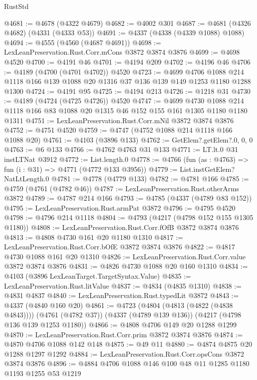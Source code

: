 \begin{lexlean}{RustStd}
\begin{coremodule}
@4681 := @4678 (@4322 @4679)
@4682 := @4002 @301
@4687 := @4681 (@4326 @4682) (@4331 (@4333 @53))
@4691 := @4337 (@4338 (@4339 @1088) @1088)
@4694 := @4555 (@4560 (@4687 @4691))
@4698 := LexLeanPreservation.Rust.Corr.mCons @3872 @3874 @3876
@4699 := @4698 @4520
@4700 := @4191 @46
@4701 := @4194 @209
@4702 := @4196 @46
@4706 := @4189 (@4700 (@4701 @4702)) @4520
@4723 := @4699
    @4706
    @1088
    @214
    @1118
    @166
    @139
    @1088
    @20
    @1316
    @37
    @136
    @139
    @149
    @1253
    @1180
    @1288
    @1300
@4724 := @4191 @95
@4725 := @4194 @213
@4726 := @1218 @31
@4730 := @4189 (@4724 (@4725 @4726)) @4520
@4747 := @4699
    @4730
    @1088
    @214
    @1118
    @166
    @83
    @1088
    @20
    @1315
    @46
    @152
    @155
    @161
    @1305
    @1180
    @1180
    @1311
@4751 := LexLeanPreservation.Rust.Corr.mNil @3872 @3874 @3876
@4752 := @4751 @4520
@4759 := @4747 (@4752 @1088 @214 @1118 @166 @1088 @20)
@4761 := @4103 (@3896 @133)
@4762 := GetElem?.getElem?.{0, 0, 0}
@4763 := @6 @133
@4766 := @4762 @4763 @31 @133
@4771 := LT.lt.{0} @31 instLTNat @3912
@4772 := List.length.{0}
@4778 := @4766 (fun (as : @4763) => fun (i : @31) => @4771 (@4772 @133 @3956))
@4779 := List.instGetElem?NatLtLength.{0}
@4781 := @4778 (@4779 @133)
@4782 := @4781 @166
@4785 := @4759 (@4761 (@4782 @46))
@4787 := LexLeanPreservation.Rust.otherArms @3872
@4789 := @4787 @214 @166
@4793 := @4785 (@4337 (@4789 @83 @152))
@4795 := LexLeanPreservation.Rust.armPat @3872
@4796 := @4795 @4520
@4798 := @4796 @214 @1118
@4804 := @4793 (@4217 (@4798 @152 @155 @1305 @1180))
@4808 := LexLeanPreservation.Rust.Corr.fOfB @3872 @3874 @3876
@4813 := @4808 @4730 @161 @20 @1180 @1310
@4817 := LexLeanPreservation.Rust.Corr.bOfE @3872 @3874 @3876
@4822 := @4817 @4730 @1088 @161 @20 @1310
@4826 := LexLeanPreservation.Rust.Corr.value @3872 @3874 @3876
@4831 := @4826 @4730 @1088 @20 @160 @1310
@4834 := @4103 (@3896 LexLeanTarget.TargetSyntax.Value)
@4835 := LexLeanPreservation.Rust.litValue
@4837 := @4834 (@4835 @1310)
@4838 := @4831 @4837
@4840 := LexLeanPreservation.Rust.typedLit @3872
@4843 := @4337 (@4840 @160 @20)
@4861 := @4723
    (@4804 (@4813 (@4822 (@4838 @4843))))
    (@4761 (@4782 @37))
    (@4337 (@4789 @139 @136))
    (@4217 (@4798 @136 @139 @1253 @1180))
@4866 := @4808 @4706 @149 @20 @1288 @1299
@4870 := LexLeanPreservation.Rust.Corr.prim @3872 @3874 @3876
@4874 := @4870 @4706 @1088 @142 @148
@4875 := @49 @11
@4880 := @4874 @4875 @20 @1288 @1297 @1292
@4884 := LexLeanPreservation.Rust.Corr.opsCons @3872 @3874 @3876
@4896 := @4884 @4706 @1088 @146 @100 @48 @11 @1285 @1180 @1193 @1255 @53 @1219

\end{coremodule}
\end{lexlean}
